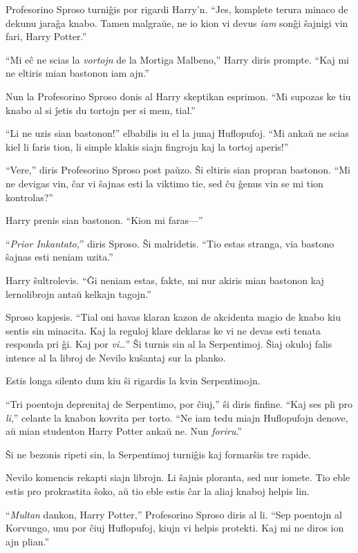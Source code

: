 Profesorino Sproso turniĝis por rigardi Harry'n. ``Jes, komplete terura minaco
de dekunu jaraĝa knabo. Tamen malgraŭe, ne io kion vi devus \emph{iam} sonĝi
ŝajnigi vin fari, Harry Potter.''

``Mi eĉ ne scias la \emph{vortojn} de la Mortiga Malbeno,'' Harry diris
prompte. ``Kaj mi ne eltiris mian bastonon iam ajn.''

Nun la Profesorino Sproso donis al Harry skeptikan esprimon. ``Mi supozas ke tiu
knabo al si ĵetis du tortojn per si mem, tial.''

``Li ne uzis sian bastonon!'' elbabilis iu el la junaj
Huflopufoj. ``Mi ankaŭ ne scias kiel li faris tion, li simple klakis
siajn fingrojn kaj la tortoj aperis!''

``Vere,'' diris Profesorino Sproso post paŭzo. Ŝi eltiris sian propran bastonon.
``Mi ne devigas vin, ĉar vi ŝajnas esti la viktimo tie, sed ĉu ĝenus vin se mi
tion kontrolas?''

Harry prenis sian bastonon. ``Kion mi faras—''

``\emph{Prior Inkantato,}'' diris Sproso. Ŝi malridetis. ``Tio estas
stranga, via bastono ŝajnas esti neniam uzita.''

Harry ŝultrolevis. ``Ĝi neniam estas, fakte, mi nur akiris mian
bastonon kaj lernolibrojn antaŭ kelkajn tagojn.''

Sproso kapjesis. ``Tial oni havas klaran kazon de akcidenta magio de knabo kiu
sentis sin minacita. Kaj la reguloj klare deklaras ke vi ne devas esti tenata
responda pri ĝi. Kaj por \emph{vi}\ldots'' Ŝi turnis sin al la Serpentimoj. Ŝiaj
okuloj falis intence al la libroj de Nevilo kuŝantaj sur la planko.

Estis longa silento dum kiu ŝi rigardis la kvin Serpentimojn.

``Tri poentojn deprenitaj de Serpentimo, por ĉiuj,'' ŝi diris finfine. ``Kaj ses
pli pro \emph{li},'' celante la knabon kovrita per torto. ``Ne iam tedu
miajn Huflopufojn denove, aŭ mian studenton Harry Potter ankaŭ ne. Nun
\emph{foriru}.''

Ŝi ne bezonis ripeti sin, la Serpentimoj turniĝis kaj formarŝis tre rapide.

Nevilo komencis rekapti siajn librojn. Li ŝajnis ploranta, sed nur iomete. Tio
eble estis pro prokrastita ŝoko, aŭ tio eble estis ĉar la aliaj knaboj helpis
lin.

``\emph{Multan} dankon, Harry Potter,'' Profesorino Sproso diris al li. ``Sep
poentojn al Korvungo, unu por ĉiuj Huflopufoj, kiujn vi helpis protekti. Kaj mi
ne diros ion ajn plian.''

